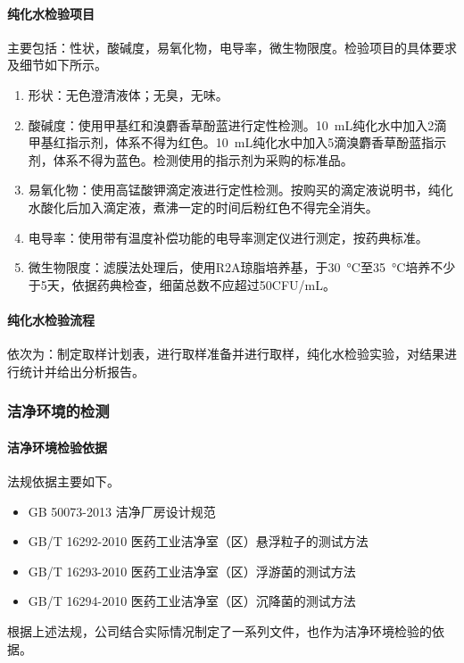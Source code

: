 \documentclass[cn,black,12pt,normal]{elegantnote}
\begin{document}
\paragraph{纯化水检验项目} 主要包括：性状，酸碱度，易氧化物，电导率，微生物限度。检验项目的具体要求及细节如下所示。
\begin{enumerate}
    \item 形状：无色澄清液体；无臭，无味。
    \item 酸碱度：使用甲基红和溴麝香草酚蓝进行定性检测。\SI{10}{\milli\liter}纯化水中加入2滴甲基红指示剂，体系不得为红色。\SI{10}{\milli\liter}纯化水中加入5滴溴麝香草酚蓝指示剂，体系不得为蓝色。检测使用的指示剂为采购的标准品。
    \item 易氧化物：使用高锰酸钾滴定液进行定性检测。按购买的滴定液说明书，纯化水酸化后加入滴定液，煮沸一定的时间后粉红色不得完全消失。
    \item 电导率：使用带有温度补偿功能的电导率测定仪进行测定，按药典标准。
    \item 微生物限度：滤膜法处理后，使用R2A琼脂培养基，于\SI{30}{\celsius}至\SI{35}{\celsius}培养不少于5天，依据药典检查，细菌总数不应超过50CFU/mL。
\end{enumerate}

\paragraph{纯化水检验流程} 依次为：制定取样计划表，进行取样准备并进行取样，纯化水检验实验，对结果进行统计并给出分析报告。

\subsubsection{洁净环境的检测}
\paragraph{洁净环境检验依据} 法规依据主要如下。
\begin{itemize}
    \item GB 50073-2013 洁净厂房设计规范
    \item GB/T 16292-2010 医药工业洁净室（区）悬浮粒子的测试方法
    \item GB/T 16293-2010 医药工业洁净室（区）浮游菌的测试方法
    \item GB/T 16294-2010 医药工业洁净室（区）沉降菌的测试方法
\end{itemize}
根据上述法规，公司结合实际情况制定了一系列文件，也作为洁净环境检验的依据。
\end{document}
